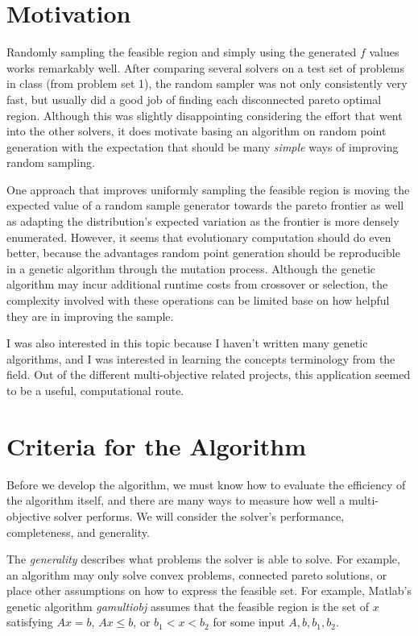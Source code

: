 \documentclass{article}
\begin{document}
\section{Motivation}

Randomly sampling the feasible region and simply using the generated $f$ values works remarkably well.
After comparing several solvers on a test set of problems in class (from problem set 1),
the random sampler was not only consistently very fast, but usually did a good job of finding each disconnected pareto optimal region.
Although this was slightly disappointing considering the effort that went into the other solvers, it does motivate basing an algorithm on random point generation with
the expectation that should be many \emph{simple} ways of improving random sampling.

One approach that improves uniformly sampling the feasible region is moving the expected value of a random sample generator towards the pareto frontier as well as adapting the
distribution's expected variation as the frontier is more densely enumerated.
However, it seems that evolutionary computation should do even better, because the advantages random point generation should be reproducible in a genetic algorithm through the mutation process.
Although the genetic algorithm may incur additional runtime costs from crossover or selection, the complexity involved with these operations can be limited
base on how helpful they are in improving the sample.

I was also interested in this topic because I haven't written many genetic algorithms, and I was interested in learning the concepts terminology from the field.
Out of the different multi-objective related projects, this application seemed to be a useful, computational route.

\section{Criteria for the Algorithm}

Before we develop the algorithm, we must know how to evaluate the efficiency of the algorithm itself, and
there are many ways to measure how well a multi-objective solver performs.
We will consider the solver's performance, completeness, and generality.

The \emph{generality} describes what problems the solver is able to solve.
For example, an algorithm may only solve convex problems, connected pareto solutions, or place other assumptions on how to express the feasible set.
For example, Matlab's genetic algorithm \emph{gamultiobj} assumes that the feasible region is the set of $x$ satisfying $Ax = b$, $Ax \le b$, or $b_1 < x < b_2$ for some input $A, b, b_1, b_2$.
\end{document}
